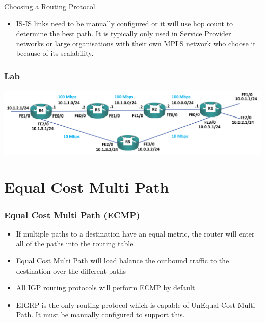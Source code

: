 \documentclass[pdflatex,compress,mathserif]{beamer}
\begin{document}
\begin{frame}{Choosing a Routing Protocol}
	\begin{itemize}
		\item IS-IS links need to be manually configured or it will use hop count to
determine the best path. It is typically only used in Service Provider
networks or large organisations with their own MPLS network who
choose it because of its scalability.
	\end{itemize}
\end{frame}

\begin{frame}
	\frametitle{Lab}
	\begin{center}
		\includegraphics[width=\linewidth]{img/img23}
	\end{center}
\end{frame}

\section{Equal Cost Multi Path}

\begin{frame}
	\frametitle{Equal Cost Multi Path (ECMP)}
	\begin{itemize}
		\item If multiple paths to a destination have an equal metric, the router will
enter all of the paths into the routing table
		\item Equal Cost Multi Path will load balance the outbound traffic to the
destination over the different paths
		\item All IGP routing protocols will perform ECMP by default
		\item EIGRP is the only routing protocol which is capable of UnEqual Cost Multi
Path. It must be manually configured to support this.
	\end{itemize}
\end{frame}
\end{document}
